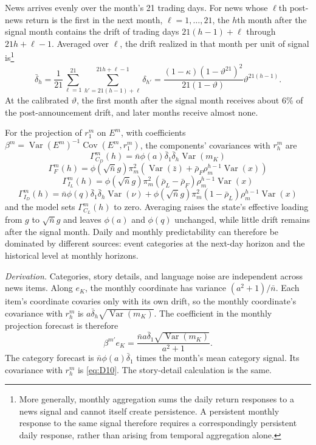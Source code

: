 \documentclass[11pt,letterpaper]{article}
\theoremstyle{remark}
\DeclareMathOperator{\Var}{Var}
\DeclareMathOperator{\Cov}{Cov}
\begin{document}
News arrives evenly over the month's 21 trading days. For news whose $\ell$th post-news return is the first in the next month, $\ell=1,\ldots,21$, the $h$th month after the signal month contains the drift of trading days $21(h-1)+\ell$ through $21h+\ell-1$. Averaged over $\ell$, the drift realized in that month per unit of signal is\footnote{More generally, monthly aggregation sums the daily return responses to a news signal and cannot itself create persistence. A persistent monthly response to the same signal therefore requires a correspondingly persistent daily response, rather than arising from temporal aggregation alone.}
\[
\bar\delta_h
=\frac{1}{21}\sum_{\ell=1}^{21}
\sum_{h'=21(h-1)+\ell}^{21h+\ell-1}\delta_{h'}
=\frac{(1-\kappa)\left(1-\vartheta^{21}\right)^2}
{21(1-\vartheta)}\vartheta^{21(h-1)}.
\]
At the calibrated $\vartheta$, the first month after the signal month receives about 6\% of the post-announcement drift, and later months receive almost none.

For the projection of $r^m_1$ on $E^m$, with coefficients $\beta^m=\Var(E^m)^{-1}\Cov(E^m,r^m_1)$, the components' covariances with $r^m_h$ are
\begin{equation}\label{eq:D10}
\Gamma^m_{C_D}(h)
=\bar n\phi(a)\bar\delta_1\bar\delta_h\Var(m_K)
\end{equation}
\begin{equation}\label{eq:D11}
\Gamma^m_F(h)
=\phi(\sqrt{\bar n}g)\pi_m^2
\left(\Var(\bar z)+\bar\rho_F\rho_m^{h-1}\Var(x)\right)
\end{equation}
\begin{equation}\label{eq:D12}
\Gamma^m_{I_L}(h)
=\phi(\sqrt{\bar n}g)\pi_m^2
(\bar\rho_L-\bar\rho_F)\rho_m^{h-1}\Var(x)
\end{equation}
\begin{equation}\label{eq:D13}
\Gamma^m_{I_D}(h)
=\bar n\phi(q)\bar\delta_1\bar\delta_h\Var(\nu)
+\phi(\sqrt{\bar n}g)\pi_m^2
(1-\bar\rho_L)\rho_m^{h-1}\Var(x)
\end{equation}
and the model sets $\Gamma^m_{C_L}(h)$ to zero. Averaging raises the state's effective loading from $g$ to $\sqrt{\bar n}g$ and leaves $\phi(a)$ and $\phi(q)$ unchanged, while little drift remains after the signal month. Daily and monthly predictability can therefore be dominated by different sources: event categories at the next-day horizon and the historical level at monthly horizons.

\emph{Derivation.}
Categories, story details, and language noise are independent across news items. Along $e_K$, the monthly coordinate has variance $(a^2+1)/\bar n$. Each item's coordinate covaries only with its own drift, so the monthly coordinate's covariance with $r^m_h$ is $a\bar\delta_h\sqrt{\Var(m_K)}$. The coefficient in the monthly projection forecast is therefore
\[
\beta^{m\prime}e_K
=\frac{\bar n a\bar\delta_1\sqrt{\Var(m_K)}}{a^2+1}.
\]
The category forecast is $\bar n\phi(a)\bar\delta_1$ times the month's mean category signal. Its covariance with $r^m_h$ is \eqref{eq:D10}. The story-detail calculation is the same.
\end{document}
